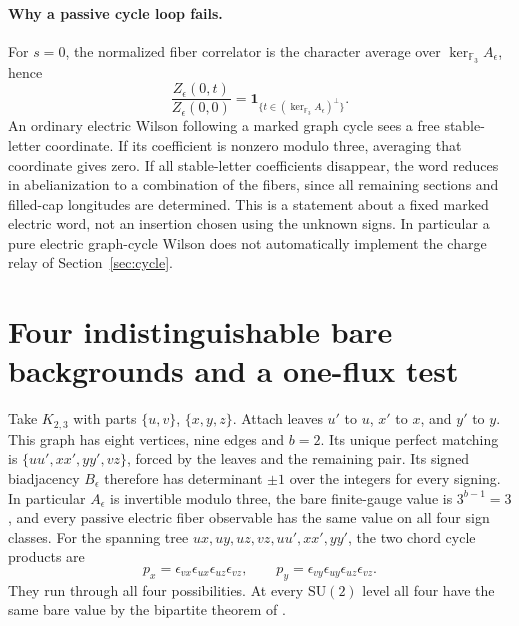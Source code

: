 \documentclass[11pt]{article}
\newcommand{\F}{\mathbb F_3}
\begin{document}
\paragraph{Why a passive cycle loop fails.}
For \(s=0\), the normalized fiber correlator is the character average over \(\ker_{\F} A_\epsilon\), hence
\[
 \frac{Z_\epsilon(0,t)}{Z_\epsilon(0,0)}
 =\mathbf1_{\{t\in(\ker_{\F} A_\epsilon)^\perp\}} .
\]
An ordinary electric Wilson following a marked graph cycle sees a free stable-letter coordinate. If its coefficient is nonzero modulo three, averaging that coordinate gives zero. If all stable-letter coefficients disappear, the word reduces in abelianization to a combination of the fibers, since all remaining sections and filled-cap longitudes are determined. This is a statement about a fixed marked electric word, not an insertion chosen using the unknown signs. In particular a pure electric graph-cycle Wilson does not automatically implement the charge relay of Section~\ref{sec:cycle}.

\section{Four indistinguishable bare backgrounds and a one-flux test}
\label{sec:two}

Take \(K_{2,3}\) with parts \(\{u,v\}\), \(\{x,y,z\}\). Attach leaves \(u'\) to \(u\), \(x'\) to \(x\), and \(y'\) to \(y\). This graph has eight vertices, nine edges and \(b=2\). Its unique perfect matching is
\(\{uu',xx',yy',vz\}\), forced by the leaves and the remaining pair. Its signed biadjacency \(B_\epsilon\) therefore has determinant \(\pm1\) over the integers for every signing. In particular \(A_\epsilon\) is invertible modulo three, the bare finite-gauge value is \(3^{b-1}=3\), and every passive electric fiber observable has the same value on all four sign classes. For the spanning tree \(ux,uy,uz,vz,uu',xx',yy'\), the two chord cycle products are
\[
 p_x=\epsilon_{vx}\epsilon_{ux}\epsilon_{uz}\epsilon_{vz},\qquad
 p_y=\epsilon_{vy}\epsilon_{uy}\epsilon_{uz}\epsilon_{vz}.
\]
They run through all four possibilities. At every \(\mathrm{SU}(2)\) level all four have the same bare value by the bipartite theorem of \cite{p50b}.
\end{document}
